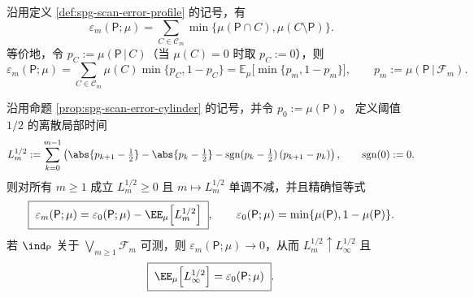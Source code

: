 \begin{proposition}[柱分解的精确表达]\label{prop:spg-scan-error-cylinder}
沿用定义 \ref{def:spg-scan-error-profile} 的记号，有
\[
\varepsilon_m(\mathsf P;\mu)
=\sum_{C\in\mathcal{C}_m}\min\{\mu(\mathsf P\cap C),\mu(C\setminus \mathsf P)\}.
\]
等价地，令 $p_C:=\mu(\mathsf P\,|\,C)$（当 $\mu(C)=0$ 时取 $p_C:=0$），则
\[
\varepsilon_m(\mathsf P;\mu)
=\sum_{C\in\mathcal{C}_m}\mu(C)\min\{p_C,1-p_C\}
=\mathbb{E}_\mu\bigl[\min\{p_m,1-p_m\}\bigr],
\qquad
p_m:=\mu(\mathsf P\,|\,\mathcal{F}_m).
\]
\end{proposition}



\begin{theorem}\label{thm:spg-scan-tanaka-stokes}
沿用命题 \ref{prop:spg-scan-error-cylinder} 的记号，并令 \(p_0:=\mu(\mathsf P)\)。
定义阈值 \(1/2\) 的离散局部时间
\[
L_m^{1/2}
:=\sum_{k=0}^{m-1}\left(
\abs{p_{k+1}-\tfrac12}-\abs{p_k-\tfrac12}-\operatorname{sgn}(p_k-\tfrac12)\,(p_{k+1}-p_k)
\right),
\qquad
\operatorname{sgn}(0):=0.
\]
则对所有 \(m\ge 1\) 成立 \(L_m^{1/2}\ge 0\) 且 \(m\mapsto L_m^{1/2}\) 单调不减，并且精确恒等式
\[
\boxed{\;
\varepsilon_m(\mathsf P;\mu)=\varepsilon_0(\mathsf P;\mu)-\EE_\mu\!\left[L_m^{1/2}\right]\; },
\qquad
\varepsilon_0(\mathsf P;\mu)=\min\{\mu(\mathsf P),1-\mu(\mathsf P)\}.
\]
若 \(\ind_{\mathsf P}\) 关于 \(\bigvee_{m\ge 1}\mathcal F_m\) 可测，则 \(\varepsilon_m(\mathsf P;\mu)\to 0\)，从而 \(L_m^{1/2}\uparrow L_\infty^{1/2}\) 且
\[
\boxed{\;
\EE_\mu\!\left[L_\infty^{1/2}\right]=\varepsilon_0(\mathsf P;\mu)\; }.
\]
\end{theorem}

